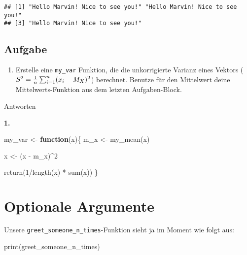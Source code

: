 \documentclass[
]{book}
\newenvironment{Shaded}{\begin{snugshade}}{\end{snugshade}}
\newcommand{\ControlFlowTok}[1]{\textcolor[rgb]{0.13,0.29,0.53}{\textbf{#1}}}
\newcommand{\DecValTok}[1]{\textcolor[rgb]{0.00,0.00,0.81}{#1}}
\newcommand{\FunctionTok}[1]{\textcolor[rgb]{0.00,0.00,0.00}{#1}}
\newcommand{\NormalTok}[1]{#1}
\newcommand{\OtherTok}[1]{\textcolor[rgb]{0.56,0.35,0.01}{#1}}
\newcommand{\SpecialCharTok}[1]{\textcolor[rgb]{0.00,0.00,0.00}{#1}}
\providecommand{\tightlist}{%
  \setlength{\itemsep}{0pt}\setlength{\parskip}{0pt}}
\begin{document}
\begin{verbatim}
## [1] "Hello Marvin! Nice to see you!" "Hello Marvin! Nice to see you!"
## [3] "Hello Marvin! Nice to see you!"
\end{verbatim}

\hypertarget{aufgabe-1}{%
\subsection{Aufgabe}\label{aufgabe-1}}

\begin{enumerate}
\def\labelenumi{\arabic{enumi}.}
\tightlist
\item
  Erstelle eine \texttt{my\_var} Funktion, die die unkorrigierte Varianz eines Vektors (\(S^2 = {1\over{n}} \sum_{i=1}^n(x_i -M_X)^2\)) berechnet. Benutze für den Mittelwert deine Mittelwerts-Funktion aus dem letzten Aufgaben-Block.
\end{enumerate}

Antworten

\textbf{1.}

\begin{Shaded}
\begin{Highlighting}[]
\NormalTok{my\_var }\OtherTok{\textless{}{-}} \ControlFlowTok{function}\NormalTok{(x)\{}
\NormalTok{  m\_x }\OtherTok{\textless{}{-}} \FunctionTok{my\_mean}\NormalTok{(x)}
  
\NormalTok{  x }\OtherTok{\textless{}{-}}\NormalTok{ (x }\SpecialCharTok{{-}}\NormalTok{ m\_x)}\SpecialCharTok{\^{}}\DecValTok{2}
  
  \FunctionTok{return}\NormalTok{(}\DecValTok{1}\SpecialCharTok{/}\FunctionTok{length}\NormalTok{(x) }\SpecialCharTok{*} \FunctionTok{sum}\NormalTok{(x))}
\NormalTok{\}}
\end{Highlighting}
\end{Shaded}

\hypertarget{optionale-argumente}{%
\section{Optionale Argumente}\label{optionale-argumente}}

Unsere \texttt{greet\_someone\_n\_times}-Funktion sieht ja im Moment wie folgt aus:

\begin{Shaded}
\begin{Highlighting}[]
\FunctionTok{print}\NormalTok{(greet\_someone\_n\_times)}
\end{Highlighting}
\end{Shaded}
\end{document}
